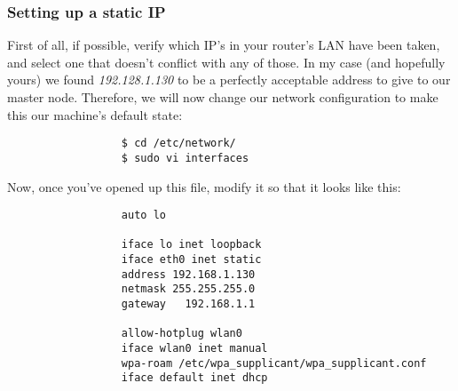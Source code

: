 \documentclass[]{article}
\begin{document}
                  \subsubsection{Setting up a static IP}
                  First of all, if possible, verify which IP's in your router's LAN have been taken, and select one that doesn't conflict with any of
                  those. In my case (and hopefully yours) we found \textit{192.128.1.130} to be a perfectly acceptable address to give to our master node. 
                  Therefore, we will now change our network configuration to make this our machine's default state:
                  \begin{lstlisting}
                  $ cd /etc/network/
                  $ sudo vi interfaces
                  \end{lstlisting}
                  Now, once you've opened up this file, modify it so that it looks like this:
                  \begin{lstlisting}
                  auto lo

                  iface lo inet loopback
                  iface eth0 inet static
                  address 192.168.1.130
                  netmask 255.255.255.0
                  gateway   192.168.1.1

                  allow-hotplug wlan0
                  iface wlan0 inet manual
                  wpa-roam /etc/wpa_supplicant/wpa_supplicant.conf
                  iface default inet dhcp
                  \end{lstlisting}
\end{document}
